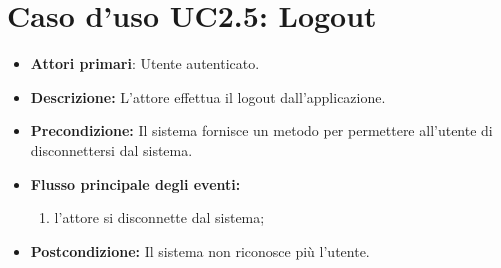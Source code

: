 		\section{Caso d'uso UC2.5: Logout }
		\begin{itemize}
			\item \textbf{Attori primari}: Utente autenticato.
			\item \textbf{Descrizione:} L'attore effettua il logout dall'applicazione.
			\item \textbf{Precondizione:} Il sistema fornisce un metodo per permettere all'utente di disconnettersi dal sistema.
			\item \textbf{Flusso principale degli eventi:}
			\begin{enumerate}
				\item l'attore si disconnette dal sistema;
			\end{enumerate}
			\item \textbf{Postcondizione:} Il sistema non riconosce più l'utente.
		\end{itemize}
			

			






